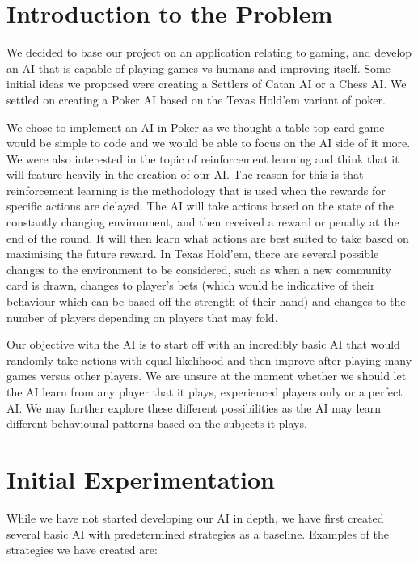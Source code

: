\documentclass{article}
\begin{document}
\begin{multicols*}{2}
\section{Introduction to the Problem}
We decided to base our project on an application relating to gaming, and develop an AI that is capable of playing games vs humans and improving itself. Some initial ideas we proposed were creating a Settlers of Catan AI or a Chess AI. We settled on creating a Poker AI based on the Texas Hold'em variant of poker.
\newline

We chose to implement an AI in Poker as we thought a table top card game would be simple to code and we would be able to focus on the AI side of it more. We were also interested in the topic of reinforcement learning and think that it will feature heavily in the creation of our AI. The reason for this is that reinforcement learning is the methodology that is used when the rewards for specific actions are delayed. The AI will take actions based on the state of the constantly changing environment, and then received a reward or penalty at the end of the round. It will then learn what actions are best suited to take based on maximising the future reward. In Texas Hold'em, there are several possible changes to the environment to be considered, such as when a new community card is drawn, changes to player's bets (which would be indicative of their behaviour which can be based off the strength of their hand) and changes to the number of players depending on players that may fold.
\newline

Our objective with the AI is to start off with an incredibly basic AI that would randomly take actions with equal likelihood and then improve after playing many games versus other players. We are unsure at the moment whether we should let the AI learn from any player that it plays, experienced players only or a perfect AI. We may further explore these different possibilities as the AI may learn different behavioural patterns based on the subjects it plays.





\section{Initial Experimentation}
While we have not started developing our AI in depth, we have first created several basic AI with predetermined strategies as a baseline. Examples of the strategies we have created are:


\end{multicols*}
\end{document}
